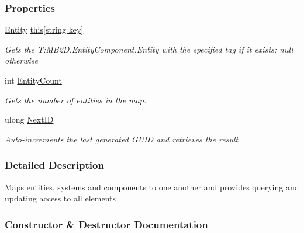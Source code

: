 \subsubsection*{Properties}
\begin{DoxyCompactItemize}
\item 
\hyperlink{class_m_b2_d_1_1_entity_component_1_1_entity}{Entity} \hyperlink{class_m_b2_d_1_1_entity_component_1_1_entity_map_ae29ad08673cc4c756b43bd3a72c35b84}{this\mbox{[}string key\mbox{]}}
\begin{DoxyCompactList}\small\item\em Gets the T\+:\+M\+B2\+D.\+Entity\+Component.\+Entity with the specified tag if it exists; null otherwise \end{DoxyCompactList}\item 
int \hyperlink{class_m_b2_d_1_1_entity_component_1_1_entity_map_a607d25be9724ca759ecef96fe76ee516}{Entity\+Count}
\begin{DoxyCompactList}\small\item\em Gets the number of entities in the map. \end{DoxyCompactList}\item 
ulong \hyperlink{class_m_b2_d_1_1_entity_component_1_1_entity_map_a812155313251122f297b6653ab4f4ec1}{Next\+ID}
\begin{DoxyCompactList}\small\item\em Auto-\/increments the last generated G\+U\+ID and retrieves the result \end{DoxyCompactList}\end{DoxyCompactItemize}


\subsubsection{Detailed Description}
Maps entities, systems and components to one another and provides querying and updating access to all elements 



\subsubsection{Constructor \& Destructor Documentation}
\hypertarget{class_m_b2_d_1_1_entity_component_1_1_entity_map_a3904c9181b806e476be24848837e1b53}{}\label{class_m_b2_d_1_1_entity_component_1_1_entity_map_a3904c9181b806e476be24848837e1b53} 

